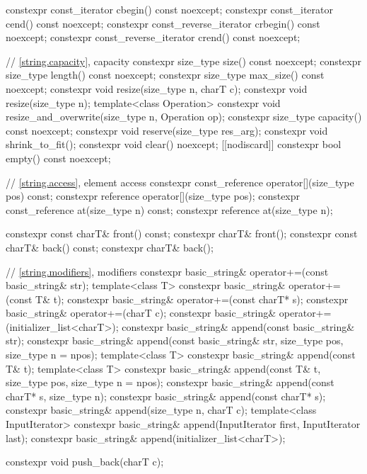 \begin{codeblock}
{{    constexpr const_iterator         cbegin() const noexcept;
    constexpr const_iterator         cend() const noexcept;
    constexpr const_reverse_iterator crbegin() const noexcept;
    constexpr const_reverse_iterator crend() const noexcept;

    // \ref{string.capacity}, capacity
    constexpr size_type size() const noexcept;
    constexpr size_type length() const noexcept;
    constexpr size_type max_size() const noexcept;
    constexpr void resize(size_type n, charT c);
    constexpr void resize(size_type n);
    template<class Operation> constexpr void resize_and_overwrite(size_type n, Operation op);
    constexpr size_type capacity() const noexcept;
    constexpr void reserve(size_type res_arg);
    constexpr void shrink_to_fit();
    constexpr void clear() noexcept;
    [[nodiscard]] constexpr bool empty() const noexcept;

    // \ref{string.access}, element access
    constexpr const_reference operator[](size_type pos) const;
    constexpr reference       operator[](size_type pos);
    constexpr const_reference at(size_type n) const;
    constexpr reference       at(size_type n);

    constexpr const charT& front() const;
    constexpr charT&       front();
    constexpr const charT& back() const;
    constexpr charT&       back();

    // \ref{string.modifiers}, modifiers
    constexpr basic_string& operator+=(const basic_string& str);
    template<class T>
      constexpr basic_string& operator+=(const T& t);
    constexpr basic_string& operator+=(const charT* s);
    constexpr basic_string& operator+=(charT c);
    constexpr basic_string& operator+=(initializer_list<charT>);
    constexpr basic_string& append(const basic_string& str);
    constexpr basic_string& append(const basic_string& str, size_type pos, size_type n = npos);
    template<class T>
      constexpr basic_string& append(const T& t);
    template<class T>
      constexpr basic_string& append(const T& t, size_type pos, size_type n = npos);
    constexpr basic_string& append(const charT* s, size_type n);
    constexpr basic_string& append(const charT* s);
    constexpr basic_string& append(size_type n, charT c);
    template<class InputIterator>
      constexpr basic_string& append(InputIterator first, InputIterator last);
    constexpr basic_string& append(initializer_list<charT>);

    constexpr void push_back(charT c);

}}
\end{codeblock}
